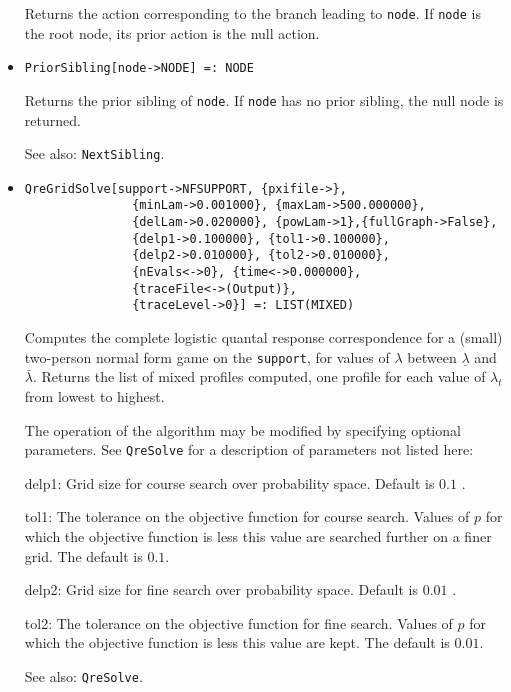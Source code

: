 \begin{itemize}
\bd
Returns the action corresponding to the branch leading to \verb+node+.
If \verb+node+ is the root node, its prior action is the null action.
\ed

\item{}
\protect \large \begin{verbatim}
PriorSibling[node->NODE] =: NODE 
\end{verbatim}\normalsize

\bd
Returns the prior sibling of \verb+node+.  If \verb+node+ has
no prior sibling, the null node is returned.
\item [See also:] \verb+NextSibling+.
\ed



\item{}
\protect \large \begin{verbatim}
QreGridSolve[support->NFSUPPORT, {pxifile->}, 
               {minLam->0.001000}, {maxLam->500.000000}, 
               {delLam->0.020000}, {powLam->1},{fullGraph->False}, 
               {delp1->0.100000}, {tol1->0.100000}, 
               {delp2->0.010000}, {tol2->0.010000}, 
               {nEvals<->0}, {time<->0.000000}, 
               {traceFile<->(Output)}, 
               {traceLevel->0}] =: LIST(MIXED) 
\end{verbatim}\normalsize

\bd
Computes the complete logistic quantal response correspondence for
a (small) two-person normal form game on the \verb+support+, for values of
$\lambda$ between $\underline{\lambda}$ and $\bar{\lambda}.$ Returns
the list of mixed profiles computed, one profile for each value of
$\lambda_t$ from lowest to highest.

The operation of the algorithm may be modified by specifying optional
parameters.  See \verb+QreSolve+ for a description of parameters
not listed here:
\bd
\item
[delp1:] Grid size for course search over probability space.  Default
is $0.1$ .
\item
[tol1:] The tolerance on the objective function for course search.
Values of $p$ for which the objective function is less this value are
searched further on a finer grid.  The default is $0.1$.
\item
[delp2:] Grid size for fine search over probability space.  Default is
$0.01$ .
\item
[tol2:] The tolerance on the objective function for fine search.
Values of $p$ for which the objective function is less this value are
kept.  The default is $0.01$.  
\ed
\item [See also:] \verb+QreSolve+.
\ed


\end{itemize}

